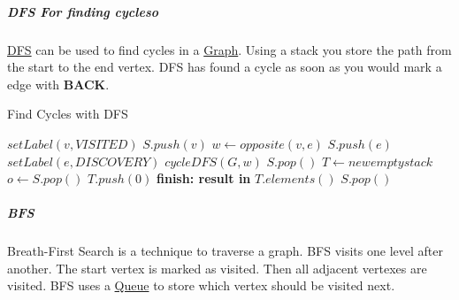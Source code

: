\documentclass[11pt,twoside,twocolumn,landscape]{article}
\begin{document}
\subparagraph{DFS For finding cycleso}
\label{sec:org159cf28}

\href{../../../roam/20220202095038-dfs.org}{DFS} can be used to find cycles in a \href{../../../roam/20220201163000-graph.org}{Graph}.
Using a stack you store the path from the start to the end vertex.
DFS has found a cycle as soon as you would mark a edge with \textbf{BACK}.


\begin{algorithm}
  \caption{Find Cycles with DFS}
  \begin{algorithmic}
    \State $setLabel(v, VISITED)$
    \State $S.push(v)$
    \State $w \leftarrow opposite(v, e)$
    \State $S.push(e)$
    \State $setLabel(e, DISCOVERY)$
    \State $cycleDFS(G, w)$
    \State $S.pop()$
    \Else
    \State $T \leftarrow new empty stack$
    \Repeat
    \State $o \leftarrow S.pop()$
    \State $T.push(0)$
    \State \textbf{finish: result in} $T.elements()$
    \EndIf
    \EndIf
    \EndFor
    \State $S.pop()$
    \EndProcedure
  \end{algorithmic}
\end{algorithm}

\subparagraph{BFS}
\label{sec:org8a104b7}

Breath-First Search is a technique to traverse a graph.
BFS visits one level after another.
The start vertex is marked as visited.
Then all adjacent vertexes are visited.
BFS uses a \href{../../../roam/20210806221243-queue.org}{Queue} to store which vertex should be visited next.
\end{document}
